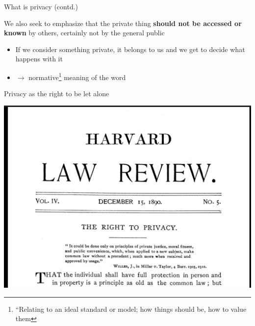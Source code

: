 \documentclass[12pt,aspectratio=169,handout]{beamer}
\begin{document}
\begin{frame}{What is privacy (contd.)}

We also seek to emphasize that the private thing \textbf{should not be accessed or known} by others, certainly not by the general public

\begin{itemize}
\item If we consider something private, it belongs to us and we get to decide what happens with it
\item $\rightarrow$ normative\footnote{``Relating to an ideal standard or model; how things should be, how to value them} meaning of the word
\end{itemize}



\end{frame}


\begin{frame}{Privacy as the right to be let alone}

\includegraphics[width=0.8\linewidth]{img/harvard-law-review.jpg}


\end{frame}
\end{document}
